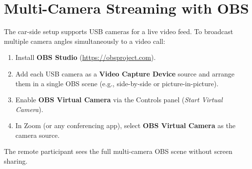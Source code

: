 ﻿\documentclass[12pt, letterpaper]{article}
\begin{document}
\section{Multi-Camera Streaming with OBS}

The car-side setup supports USB cameras for a live video feed.
To broadcast multiple camera angles simultaneously to a video call:

\begin{enumerate}
  \item Install \textbf{OBS Studio} (\url{https://obsproject.com}).
  \item Add each USB camera as a \textbf{Video Capture Device} source and arrange
        them in a single OBS scene (e.g., side-by-side or picture-in-picture).
  \item Enable \textbf{OBS Virtual Camera} via the Controls panel
        (\textit{Start Virtual Camera}).
  \item In Zoom (or any conferencing app), select \textbf{OBS Virtual Camera} as the
        camera source.
\end{enumerate}

The remote participant sees the full multi-camera OBS scene without screen sharing.
\end{document}

